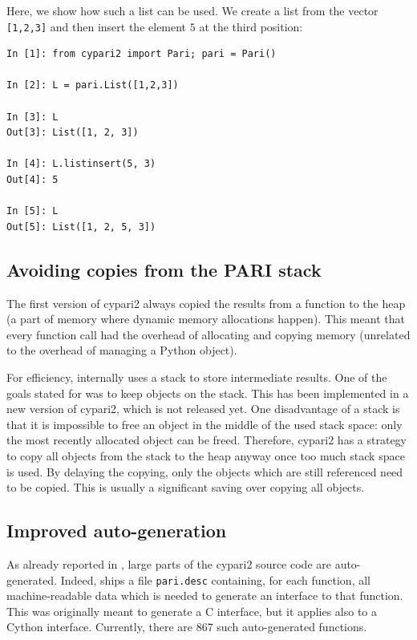 \documentclass{deliverablereport}
\begin{document}
Here, we show how such a list can be used.
We create a list from the vector \verb/[1,2,3]/ and then insert the
element $5$ at the third position:
\begin{verbatim}
In [1]: from cypari2 import Pari; pari = Pari()

In [2]: L = pari.List([1,2,3])

In [3]: L
Out[3]: List([1, 2, 3])

In [4]: L.listinsert(5, 3)
Out[4]: 5

In [5]: L
Out[5]: List([1, 2, 5, 3])
\end{verbatim}

\subsection{Avoiding copies from the PARI stack}

The first version of cypari2 always copied the results from a
\PariGP function to the heap
(a part of memory where dynamic memory allocations happen).
This meant that every function call had the overhead
of allocating and copying memory
(unrelated to the overhead of managing a Python object).

For efficiency, \Pari internally uses a stack to store intermediate results.
One of the goals stated for  was to
keep objects on the \Pari stack.
This has been implemented in a new version of cypari2, which is not released yet.
One disadvantage of a stack is that it is impossible
to free an object in the middle of the used stack space:
only the most recently allocated object can be freed.
Therefore, cypari2 has a strategy to copy all objects
from the stack to the heap anyway once too much stack space is used.
By delaying the copying, only the objects which are still referenced
need to be copied.
This is usually a significant saving over copying all objects.

\subsection{Improved auto-generation}

As already reported in ,
large parts of the cypari2 source code are auto-generated.
Indeed, \Pari ships a file \verb/pari.desc/ containing,
for each function, all machine-readable data which is needed to generate
an interface to that function.
This was originally meant to generate a C interface,
but it applies also to a Cython interface.
Currently, there are 867 such auto-generated functions.
\end{document}
